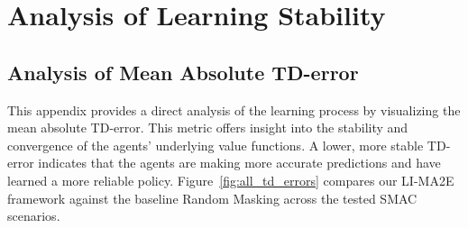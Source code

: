 

\chapter{Analysis of Learning Stability}
\section{Analysis of Mean Absolute TD-error}
\label{app:td_error_abs_analysis}

This appendix provides a direct analysis of the learning process by visualizing the mean absolute TD-error. This metric offers insight into the stability and convergence of the agents' underlying value functions. A lower, more stable TD-error indicates that the agents are making more accurate predictions and have learned a more reliable policy. Figure~\ref{fig:all_td_errors} compares our LI-MA2E framework against the baseline Random Masking across the tested SMAC scenarios.

